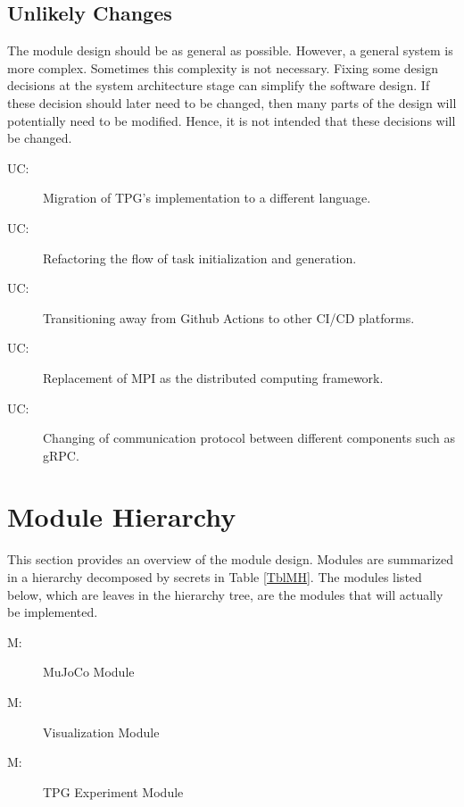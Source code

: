 \documentclass[12pt, titlepage]{article}
\newcounter{ucnum}
\newcommand{\uctheucnum}{UC\theucnum}
\newcounter{mnum}
\newcommand{\mthemnum}{M\themnum}
\begin{document}
\subsection{Unlikely Changes} \label{SecUchange}

The module design should be as general as possible. However, a general system is
more complex. Sometimes this complexity is not necessary. Fixing some design
decisions at the system architecture stage can simplify the software design. If
these decision should later need to be changed, then many parts of the design
will potentially need to be modified. Hence, it is not intended that these
decisions will be changed.

\begin{description}
  \item[ \uctheucnum \label{ucControl}:] Migration of TPG's implementation to a different language.
  \item[ \uctheucnum \label{ucControl}:] Refactoring the flow of task initialization and generation.
  \item[ \uctheucnum \label{ucVerify}:] Transitioning away from Github Actions to other CI/CD platforms.
  \item[ \uctheucnum \label{ucControl}:] Replacement of MPI as the distributed computing framework.
  \item[ \uctheucnum \label{ucControl}:] Changing of communication protocol between different components such as gRPC.
\end{description}

\section{Module Hierarchy} \label{SecMH}

This section provides an overview of the module design. Modules are summarized
in a hierarchy decomposed by secrets in Table \ref{TblMH}. The modules listed
below, which are leaves in the hierarchy tree, are the modules that will
actually be implemented.

\begin{description}
\item [ \mthemnum \label{mMuJoCo}:] MuJoCo Module
\item [ \mthemnum \label{mVisualization}:] Visualization Module
\item [ \mthemnum \label{mExperiment}:] TPG Experiment Module
\end{description}
\end{document}
